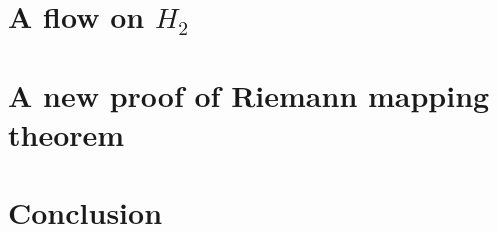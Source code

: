 \documentclass{article}
\begin{document}
\section{A flow on $H_2$}\label{sec:flow}

\section{A new proof of Riemann mapping theorem}\label{sec:riemann-mapping}

\section{Conclusion}\label{sec:conclusion}
\end{document}
